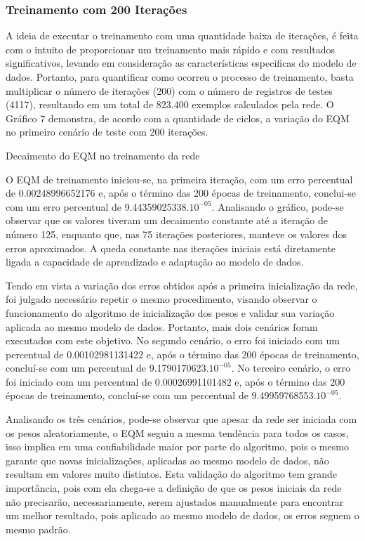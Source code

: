 \subsubsection{Treinamento com 200 Iterações}	
A ideia de executar o treinamento com uma quantidade baixa de iterações, é feita com o intuito de proporcionar um treinamento mais rápido e com resultados significativos, levando em consideração as características especificas do modelo de dados. Portanto, para quantificar como ocorreu o processo de treinamento, basta multiplicar o número de iterações (200) com o número de registros de testes (4117), resultando em um total de 823.400 exemplos calculados pela rede. O Gráfico 7 demonstra, de acordo com a quantidade de ciclos, a variação do EQM no primeiro cenário de teste com 200 iterações.
\begin{grafico}[h]
	\centering
	\caption{Decaimento do EQM no treinamento da rede}
	\label{lingua}
\end{grafico}

O EQM de treinamento iniciou-se, na primeira iteração, com um erro percentual de 0.00248996652176 e, após o término das 200 épocas de treinamento, conclui-se com um erro percentual de 9.44359025338.$10^{-05}$. Analisando o gráfico, pode-se observar que os valores tiveram um decaimento constante até a iteração de número 125, enquanto que, nas 75 iterações posteriores, manteve os valores dos erros aproximados. A queda constante nas iterações iniciais está diretamente ligada a capacidade de aprendizado e adaptação ao modelo de dados.

Tendo em vista a variação dos erros obtidos após a primeira inicialização da rede, foi julgado necessário repetir o mesmo procedimento, visando observar o funcionamento do algoritmo de inicialização dos pesos e validar sua variação aplicada ao mesmo modelo de dados. Portanto, mais dois cenários foram executados com este objetivo. No segundo cenário, o erro foi iniciado com um percentual de 0.00102981131422 e, após o término das 200 épocas de treinamento, concluí-se com um percentual de 9.1790170623.$10^{-05}$. No terceiro cenário, o erro foi iniciado com um percentual de 0.00026991101482 e, após o término das 200 épocas de treinamento, concluí-se com um percentual de 9.49959768553.$10^{-05}$.

Analisando os três cenários, pode-se observar que apesar da rede ser iniciada com os pesos aleatoriamente, o EQM seguiu a mesma tendência para todos os casos, isso implica em uma confiabilidade maior por parte do algoritmo, pois o mesmo garante que novas inicializações, aplicadas ao mesmo modelo de dados, não resultam em valores muito distintos. Esta validação do algoritmo tem grande importância, pois com ela chega-se a definição de que os pesos iniciais da rede não precisarão, necessariamente, serem ajustados manualmente para encontrar um melhor resultado, pois aplicado ao mesmo modelo de dados, os erros seguem o mesmo padrão.

